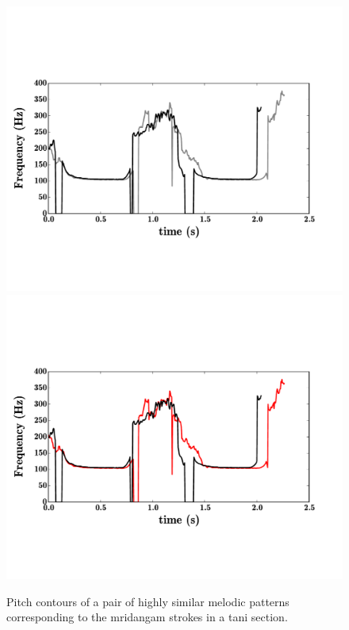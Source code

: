 {\begin{figure}
	\begin{center}
		\ifdefined\PRINTVER
		\includegraphics[width=\figSizeSeventy]{ch05_preprocessing/figures/taniPatterns_BW.pdf}
		\else
		\includegraphics[width=\figSizeSeventy]{ch05_preprocessing/figures/taniPatterns.pdf}
		\fi
	\end{center}
	\caption[Melodic patterns corresponding to the \gls{mridangam} strokes]{Pitch contours of a pair of highly similar melodic patterns corresponding to the \gls{mridangam} strokes in a \gls{tani} section.}
	\label{fig:pitch_pattern_tani}
\end{figure}

}
